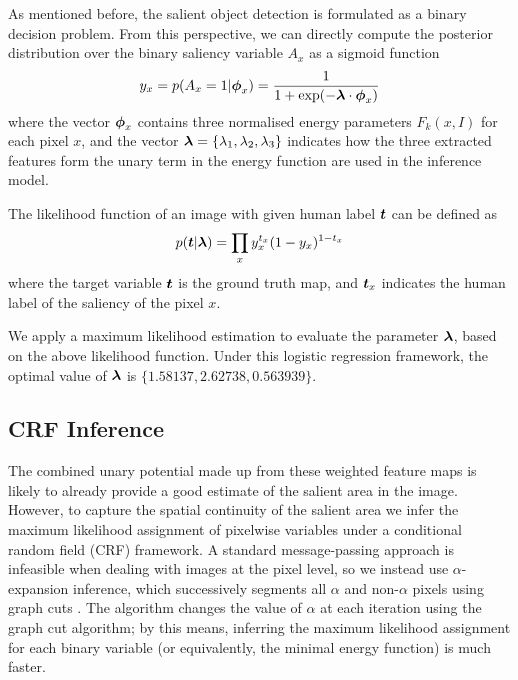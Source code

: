 \documentclass[10pt,twocolumn,letterpaper]{article}
\begin{document}
As mentioned before, the salient object detection is formulated as a binary decision problem. From this perspective, we can directly compute the posterior distribution over the binary saliency variable $A_x$ as a sigmoid function
$$ y_x = p ( A_x = 1 | \boldsymbol{\phi}_x) = \frac{1}{1 + \exp(-\boldsymbol{\lambda} \cdot \boldsymbol{\phi}_x)}$$
where the vector $\boldsymbol{\phi}_x$ contains three normalised energy parameters $F_k (x, I)$ for each pixel $x$, and the vector $\boldsymbol{\lambda} = \{ \lambda_1, \lambda_2, \lambda_3\}$ indicates how the three extracted features form the unary term in the energy function are used in the inference model.

The likelihood function of an image with given human label $\boldsymbol{t}$ can be defined as
$$ p( \boldsymbol{t} | \boldsymbol{\lambda}) = \prod_{x} y_{x}^{t_{x}} (1 - y_{x})^{1-t_x} $$
where the target variable $\boldsymbol{t}$ is the ground truth map, and $\boldsymbol{t}_x$ indicates the human label of the saliency of the pixel $x$. 

We apply a maximum likelihood estimation to evaluate the parameter $\boldsymbol{\lambda}$, based on the above likelihood function. Under this logistic regression framework, the optimal value of $\boldsymbol{\lambda}$ is $\{1.58137,2.62738,0.563939\}$.
\subsection{CRF Inference}
The combined unary potential made up from these weighted feature maps is likely to already provide a good estimate of the salient area in the image.  However, to capture the spatial continuity of the salient area we infer the maximum likelihood assignment of pixelwise variables under a conditional random field (CRF) framework.  A standard message-passing approach is infeasible when dealing with images at the pixel level, so we instead use $\alpha$-expansion inference, which successively segments all $\alpha$ and non-$\alpha$ pixels using graph cuts \cite{graphcut}.  The algorithm changes the value of $\alpha$ at each iteration using the graph cut algorithm; by this means, inferring the maximum likelihood assignment for each binary variable (or equivalently, the minimal energy function) is much faster. 
\end{document}
